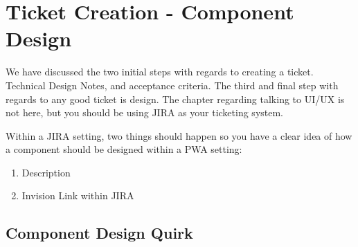 \maketitle{}
\section{ Ticket Creation - Component Design }
We have discussed the two initial steps with regards to creating a ticket.
Technical Design Notes, and acceptance criteria. The third and final step
with regards to any good ticket is design. The chapter regarding talking to
UI/UX is not here, but you should be using JIRA as your ticketing system.

Within a JIRA setting, two things should happen so you have a clear idea of
how a component should be designed within a PWA setting:

\begin{enumerate}
  \item Description
  \item Invision Link within JIRA
\end{enumerate}

\subsection{ Component Design Quirk }
